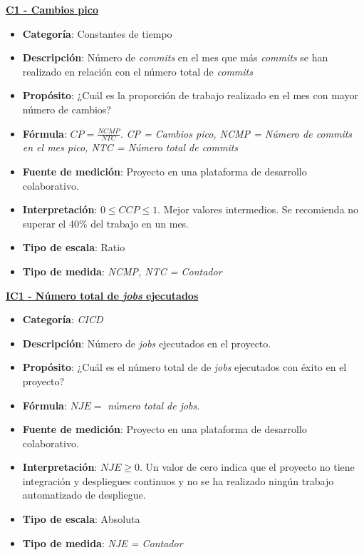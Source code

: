 \textbf{\underline{C1 - Cambios pico}}

\begin{itemize}
	\item \textbf{Categoría}: Constantes de tiempo
	\item \textbf{Descripción}: Número de \textit{commits} en el mes que más \textit{commits} se han realizado en relación con el número total de \textit{commits}
	\item \textbf{Propósito}: ¿Cuál es la proporción de trabajo realizado en el mes con mayor número de cambios?
	\item \textbf{Fórmula}: $CP = \frac{NCMP}{NTC}$. \textit{CP = Cambios pico, NCMP = Número de \textit{commits} en el mes pico, NTC = Número total de \textit{commits}}
	\item \textbf{Fuente de medición}: Proyecto en una plataforma de desarrollo colaborativo.
	\item \textbf{Interpretación}: $0 \leq CCP \leq 1$. Mejor valores intermedios. Se recomienda no superar el 40\% del trabajo en un mes.
	\item \textbf{Tipo de escala}: Ratio
	\item \textbf{Tipo de medida}: \textit{NCMP, NTC = Contador}
\end{itemize}

\textbf{\underline{IC1 - Número total de \textit{jobs} ejecutados}}
\begin{itemize}
	\item \textbf{Categoría}: \textit{CICD}
	\item \textbf{Descripción}: Número de \textit{jobs} ejecutados en el proyecto.
	\item \textbf{Propósito}: ¿Cuál es el número total de de \textit{jobs} ejecutados con éxito en el proyecto?
	\item \textbf{Fórmula}: $NJE =$ \textit{número total de jobs}.
	\item \textbf{Fuente de medición}: Proyecto en una plataforma de desarrollo colaborativo.
	\item \textbf{Interpretación}: $NJE \geq 0$. Un valor de cero indica que el proyecto no tiene integración y despliegues continuos y no se ha realizado ningún trabajo automatizado de despliegue.
	\item \textbf{Tipo de escala}: Absoluta
	\item \textbf{Tipo de medida}: \textit{NJE = Contador}
\end{itemize}

